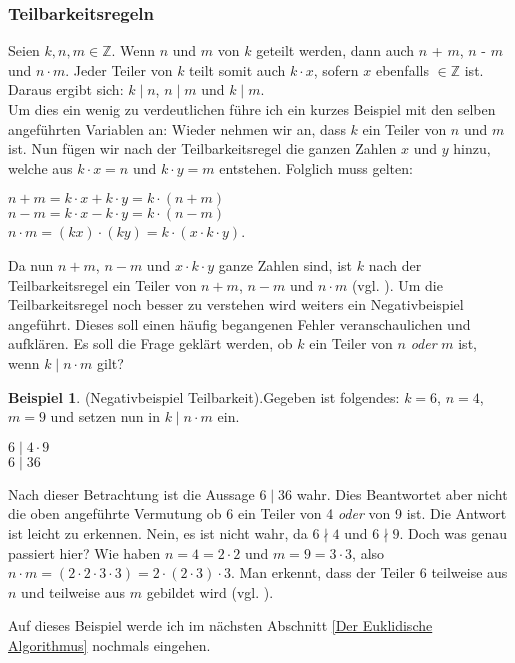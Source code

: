 \documentclass[12pt,a4paper]{article}
\theoremstyle{definition}
\newtheorem{bsp}{Beispiel}[subsection]
\begin{document}
\subsubsection{Teilbarkeitsregeln}\label{Teilbarkeitsregeln}
Seien $k, n, m \in \mathbb{Z}$.
Wenn $n$ und $m$ von $k$ geteilt werden, dann auch $n$ + $m$,\newline
$n$ - $m$ und $n\cdot m$. Jeder Teiler von $k$ teilt somit auch $k \cdot x$, sofern $x$ ebenfalls $\in \mathbb{Z}$ ist.
Daraus ergibt sich: $k \mid n$, $n \mid m$ und $k \mid m$.\\
Um dies ein wenig zu verdeutlichen führe ich ein kurzes Beispiel mit den selben angeführten Variablen an:
Wieder nehmen wir an, dass $k$ ein Teiler von $n$ und $m$ ist.
Nun fügen wir nach der Teilbarkeitsregel die ganzen Zahlen $x$ und $y$ hinzu, welche aus $k \cdot x = n$ und $k \cdot y = m$ entstehen.
Folglich muss gelten:
\begin{center}
$n + m = k \cdot x + k \cdot y = k \cdot (n + m)$\\
$n - m = k \cdot x - k \cdot y = k \cdot (n - m)$\\
$n \cdot m = (kx) \cdot (ky) = k \cdot (x \cdot k \cdot y)$.
\end{center}
Da nun $n + m$, $n - m$ und $x \cdot k \cdot y$ ganze Zahlen sind, ist $k$ nach der Teilbarkeitsregel ein Teiler von $n + m$, $n - m$ und $n \cdot m$ (vgl. \cite[13--15]{RempeGillen2009}).\newline
Um die Teilbarkeitsregel noch besser zu verstehen wird weiters ein Negativbeispiel angeführt.
Dieses soll einen häufig begangenen Fehler veranschaulichen und aufklären.
Es soll die Frage geklärt werden, ob $k$ ein Teiler von $n$ \textit{oder} $m$ ist, wenn $k \mid n \cdot m$ gilt?
\begin{bsp}(Negativbeispiel Teilbarkeit).\label{Negativbeispiel}\newline
Gegeben ist folgendes: $k = 6$, $n = 4$, $m = 9$ und setzen nun in $k \mid n \cdot m$ ein.
\begin{center}
$6 \mid 4 \cdot 9$\\
$6 \mid 36$
\end{center}
Nach dieser Betrachtung ist die Aussage $6 \mid 36$ wahr.
Dies Beantwortet aber nicht die oben angeführte Vermutung ob 6 ein Teiler von 4 \textit{oder} von 9 ist.
Die Antwort ist leicht zu erkennen.
Nein, es ist nicht wahr, da $6 \nmid 4$ und $6 \nmid 9$.\newline
Doch was genau passiert hier? Wie haben $n = 4 = 2 \cdot 2$ und $m = 9 = 3 \cdot 3$, also $n \cdot m = (2 \cdot 2 \cdot 3 \cdot 3) = 2 \cdot (2 \cdot 3) \cdot 3$.
Man erkennt, dass der Teiler 6 teilweise aus $n$ und teilweise aus $m$ gebildet wird (vgl. \cite[235]{Houston2012}).
\end{bsp}
Auf dieses Beispiel werde ich im nächsten Abschnitt \ref{Der Euklidische Algorithmus} nochmals eingehen.
\end{document}
